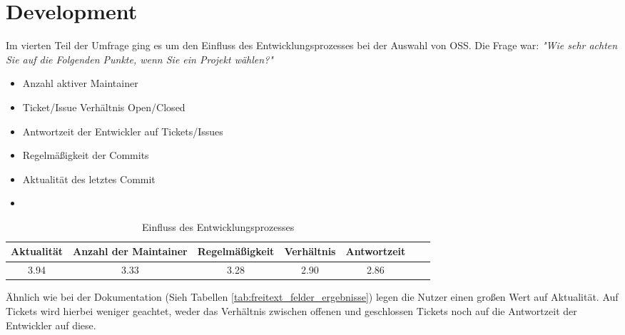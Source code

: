 \section{Development}
Im vierten Teil der Umfrage ging es um den Einfluss des Entwicklungsprozesses bei der Auswahl von
OSS. Die Frage war: \textit{"Wie sehr achten Sie auf die Folgenden Punkte, wenn Sie ein Projekt
    wählen?"}


\begin{multicols}{2}
    \begin{itemize}
        \setlength\itemsep{0em}
        \item Anzahl aktiver Maintainer
        \item Ticket/Issue Verhältnis Open/Closed
        \item Antwortzeit der Entwickler auf Tickets/Issues
        \item Regelmäßigkeit der Commits
        \item Aktualität des letztes Commit
        \item []
    \end{itemize}
\end{multicols}

\noindent
{}

\begin{table}[ht]
    \begin{tabular}{ccccccc}
        \hline
        Aktualität & Anzahl der Maintainer & Regelmäßigkeit & Verhältnis & Antwortzeit \\ \hline
        3.94       & 3.33                  & 3.28           & 2.90       & 2.86
    \end{tabular}%
    \caption{\label{tab:development}Einfluss des Entwicklungsprozesses}
\end{table}

\noindent
Ähnlich wie bei der Dokumentation (Sieh Tabellen \ref{tab:freitext_felder_ergebnisse}) legen die Nutzer
einen großen Wert auf Aktualität. 
Auf Tickets wird hierbei weniger geachtet, weder das Verhältnis zwischen offenen und geschlossen
Tickets noch auf die Antwortzeit der Entwickler auf diese.